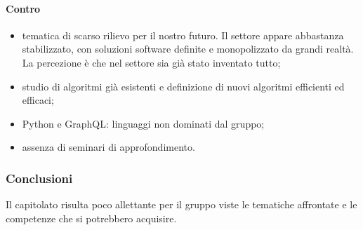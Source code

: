 \paragraph*{Contro}
\begin{itemize}
	\item tematica di scarso rilievo per il nostro futuro. Il settore appare abbastanza stabilizzato, con soluzioni software definite e monopolizzato da grandi realtà. La percezione è che nel settore sia già stato inventato tutto;
	\item studio di algoritmi già esistenti e definizione di nuovi algoritmi efficienti ed efficaci;
	\item Python e GraphQL: linguaggi non dominati dal gruppo;
	\item assenza di seminari di approfondimento.
\end{itemize}
\subsubsection{Conclusioni}
Il capitolato risulta poco allettante per il gruppo viste le tematiche affrontate e le competenze che si potrebbero acquisire.